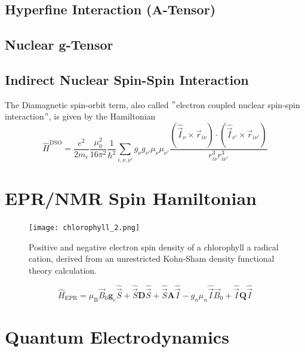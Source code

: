 \documentclass[9pt]{report}
\begin{document}
\subsection{Hyperfine Interaction ($\boldsymbol{A}$-Tensor)}

\subsection{Nuclear $\boldsymbol{g}$-Tensor}

\subsection{Indirect Nuclear Spin-Spin Interaction}
The Diamagnetic spin-orbit term, also called $"$electron coupled nuclear spin-spin interaction$"$, is given by the Hamiltonian
\begin{equation}
\hat{H}^{\mathrm{DSO}}=\frac{e^2}{2m_e}\frac{\mu_0^2}{16\pi^2}\frac{1}{\hbar^2}\sum_{i,\nu,\nu'}g_{\nu}g_{\nu'}\mu_{\nu}\mu_{\nu'}\frac{(\hat{\vec{I}}_{\nu}\times\vec{r}_{i\nu})\cdot(\hat{\vec{I}}_{\nu'}\times\vec{r}_{i\nu'})}{r_{i\nu}^{3}r_{i\nu'}^{3}}
\end{equation}



\newpage
\section{EPR/NMR Spin Hamiltonian}
\begin{figure}[H]
	\centering
	\texttt{[image: chlorophyll\_2.png]}
	\caption{Positive and negative electron spin density of a chlorophyll a radical cation, derived from an unrestricted Kohn-Sham density functional theory calculation.}
\end{figure}
\begin{equation}
\hat{H}_{\mathrm{EPR}} = \mu_{\mathrm{B}}\vec{B}_{0}\boldsymbol{g}_{e}\hat{\vec{S}} + \hat{\vec{S}}\boldsymbol{D}\hat{\vec{S}} + \hat{\vec{S}}\boldsymbol{A}\hat{\vec{I}} - g_{n}\mu_{n}\hat{\vec{I}}\vec{B}_{0} + \hat{\vec{I}}\boldsymbol{Q}\hat{\vec{I}}
\end{equation}



\section{Quantum Electrodynamics}
\end{document}
